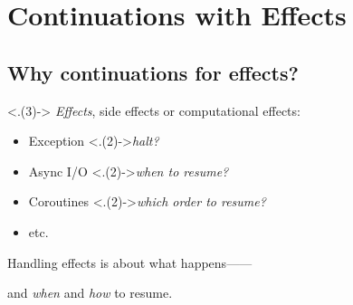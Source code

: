 \section{Continuations with Effects}
\TableOfContents{}

\subsection{Why continuations for effects?}
\begin{frame}
	\frametitlesubs{}

	{
		\only<.(3)->{\smaller[2]}
		\textit{Effects}, side effects or computational effects:
		\vspace*{-1.1\zh}

		\begin{center}
			\begin{minipage}[t]{.7\textwidth}
				\begin{itemize}
					\only<.(3)->{\setlength{\itemsep}{-.2\zh}}
					\item Exception {\only<.(2)->{\dotfill \textit{halt?}}}
					\item Async I/O {\only<.(2)->{\dotfill \textit{when to resume?}}}
					\item Coroutines {\only<.(2)->{\dotfill \textit{which order to resume?}}}
					\item etc.
				\end{itemize}
			\end{minipage}
		\end{center}
	}

	\vspace{.2\zh}
	Handling effects is about what happens------
	\pause
	\\\centerline{\larger{}and \textit{when} and \textit{how} to \textcolor{subhighlight}{resume}.}

	\pause

	\vspace{-.4\zh}
	\centering
	\hspace*{\fill}
	\begin{minipage}[t]{.41\textwidth}
		\vspace{.6\zh}


\end{minipage}
\end{frame}

